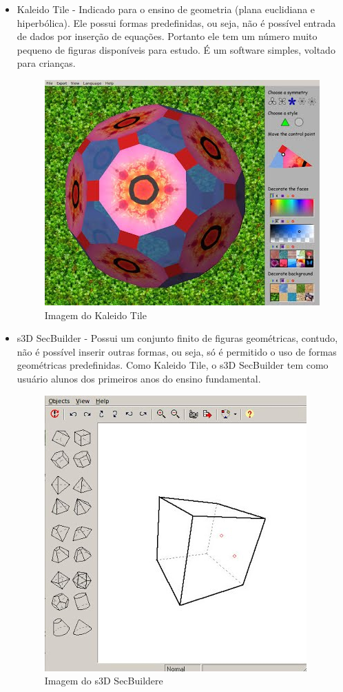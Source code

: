 \documentclass[12pt,a4paper]{article}
\begin{document}
\begin{itemize}
\begin{itemize}
\item Kaleido Tile - Indicado para o ensino de geometria (plana euclidiana e hiperbólica). Ele possui formas predefinidas, ou seja, não é possível entrada de dados por inserção de equações. Portanto ele tem um número muito pequeno de figuras disponíveis para estudo. É um software simples, voltado para crianças.

\begin{figure}[!h]
\centering
\includegraphics[scale=0.6]{imagens/tile.jpg} 
\caption{Imagem do Kaleido Tile}
\end{figure}

\item s3D SecBuilder - Possui um conjunto finito de figuras geométricas, contudo, não é possível inserir outras formas, ou seja, só é permitido o uso de formas geométricas predefinidas. Como Kaleido Tile, o  s3D SecBuilder tem como usuário alunos dos primeiros anos do ensino fundamental. 

\begin{figure}[!h]
\centering
\includegraphics[scale=0.45]{imagens/s3.jpg} 
\caption{Imagem do s3D SecBuildere}
\end{figure}


\end{itemize}
\end{itemize}
\end{document}
